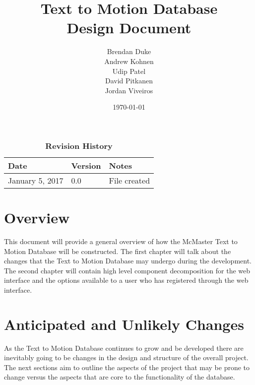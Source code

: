 \documentclass{scrreprt}
\begin{document}
\title{\bf Text to Motion Database\\[\baselineskip]\Large Design Document}
\author{Brendan Duke\\Andrew Kohnen\\Udip Patel\\David Pitkanen\\Jordan Viveiros}
\date{\today}

\maketitle

\tableofcontents


\begin{table}[bp]
\caption*{\bf Revision History}
\begin{tabularx}{\textwidth}{p{3.5cm}p{2cm}X}
\toprule {\bf Date} & {\bf Version} & {\bf Notes}\\
\midrule
January 5, 2017 & 0.0 & File created\\
\bottomrule
\end{tabularx}
\end{table}

\newpage


\chapter{Overview}
This document will provide a general overview of how the McMaster Text to Motion Database will be constructed. The first chapter will talk about the changes that the Text to Motion Database may undergo during the development. The second chapter will contain high level component decomposition for the web interface and the options available to a user who has registered through the web interface.

\chapter{Anticipated and Unlikely Changes}
As the Text to Motion Database continues to grow and be developed there are inevitably going to be changes in the design and structure of the overall project. The next sections aim to outline the aspects of the project that may be prone to change versus the aspects that are core to the functionality of the database.
\end{document}
